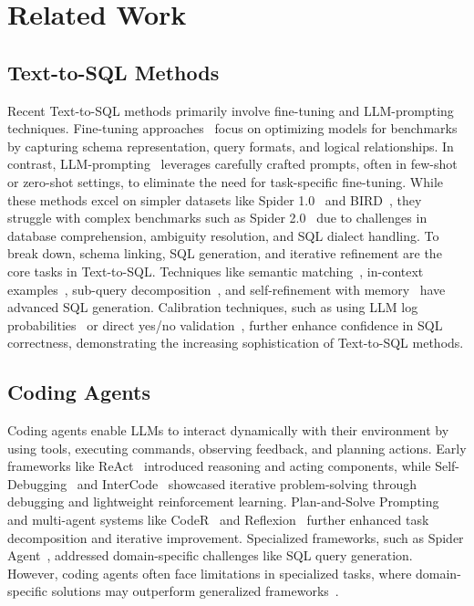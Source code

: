 \section{Related Work}

\subsection{Text-to-SQL Methods}

Recent Text-to-SQL methods primarily involve fine-tuning and LLM-prompting techniques. Fine-tuning approaches~\citep{wang2019rat, scholak2021picard, li2023resdsql, CodeS} focus on optimizing models for benchmarks by capturing schema representation, query formats, and logical relationships. In contrast, LLM-prompting~\citep{zhang2023act, gao2023text, pourreza2024din, talaei2024chess} leverages carefully crafted prompts, often in few-shot or zero-shot settings, to eliminate the need for task-specific fine-tuning. While these methods excel on simpler datasets like Spider 1.0~\citep{yu2018spider} and BIRD~\citep{li2024can}, they struggle with complex benchmarks such as Spider 2.0~\citep{lei2024spider} due to challenges in database comprehension, ambiguity resolution, and SQL dialect handling. To break down, schema linking, SQL generation, and iterative refinement are the core tasks in Text-to-SQL. Techniques like semantic matching~\citep{kothyari-etal-2023-crush4sql}, in-context examples~\citep{gao2023texttosqlempoweredlargelanguage}, sub-query decomposition~\citep{pourreza2024din}, and self-refinement with memory~\citep{shinn2024reflexion} have advanced SQL generation. Calibration techniques, such as using LLM log probabilities~\citep{ramachandran2024texttosqlcalibrationneedask} or direct yes/no validation~\citep{tian2023justaskcalibrationstrategies}, further enhance confidence in SQL correctness, demonstrating the increasing sophistication of Text-to-SQL methods.

\subsection{Coding Agents}
Coding agents enable LLMs to interact dynamically with their environment by using tools, executing commands, observing feedback, and planning actions. Early frameworks like ReAct~\citep{yao2023react} introduced reasoning and acting components, while Self-Debugging~\citep{chen2023teaching} and InterCode~\citep{yang2024intercode} showcased iterative problem-solving through debugging and lightweight reinforcement learning. Plan-and-Solve Prompting~\citep{wang2023plan} and multi-agent systems like CodeR~\citep{chen2024coder} and Reflexion~\citep{shinn2024reflexion} further enhanced task decomposition and iterative improvement. Specialized frameworks, such as Spider Agent~\citep{lei2024spider}, addressed domain-specific challenges like SQL query generation. However, coding agents often face limitations in specialized tasks, where domain-specific solutions may outperform generalized frameworks~\citep{xia2024agentless}.

